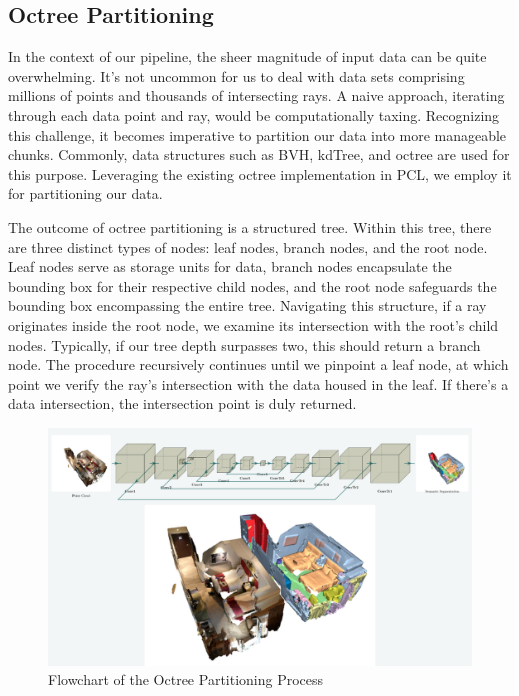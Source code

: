 \documentclass[11pt, a4paper,oneside,chapterprefix=false]{scrbook}
\begin{document}
\subsection{Octree Partitioning}

In the context of our pipeline, the sheer magnitude of input data can be quite overwhelming. It's not uncommon for us to deal with data sets comprising millions of points and thousands of intersecting rays. A naive approach, iterating through each data point and ray, would be computationally taxing. Recognizing this challenge, it becomes imperative to partition our data into more manageable chunks. Commonly, data structures such as BVH, kdTree, and octree are used for this purpose. Leveraging the existing octree implementation in PCL, we employ it for partitioning our data.

The outcome of octree partitioning is a structured tree. Within this tree, there are three distinct types of nodes: leaf nodes, branch nodes, and the root node. Leaf nodes serve as storage units for data, branch nodes encapsulate the bounding box for their respective child nodes, and the root node safeguards the bounding box encompassing the entire tree. Navigating this structure, if a ray originates inside the root node, we examine its intersection with the root's child nodes. Typically, if our tree depth surpasses two, this should return a branch node. The procedure recursively continues until we pinpoint a leaf node, at which point we verify the ray's intersection with the data housed in the leaf. If there's a data intersection, the intersection point is duly returned.

\begin{minipage}{\textwidth}
	\begin{figure}[H]
		\centering
		\includegraphics*[width=1.0\textwidth]{figures/Minkowski Engine.png}
		\caption{Flowchart of the Octree Partitioning Process}
		\label{fig:flowchart of the octree partitioning process}
	\end{figure}
\end{minipage}
\end{document}
